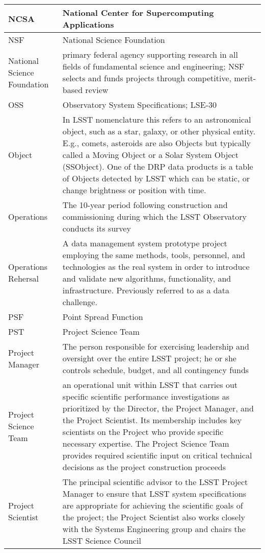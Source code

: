 \begin{longtable}{|l|p{}|}
NCSA & National \gls{Center} for Supercomputing Applications \\\hline
NSF & \gls{National Science Foundation} \\\hline
National Science Foundation & primary federal agency supporting research in all fields of fundamental science and engineering; \gls{NSF} selects and funds projects through competitive, merit-based review \\\hline
OSS & Observatory System Specifications; LSE-30 \\\hline
Object & In \gls{LSST} nomenclature this refers to an \gls{astronomical object}, such as a star, galaxy, or other physical entity. E.g., comets, asteroids are also Objects but typically called a Moving Object or a \gls{Solar System Object} (SSObject). One of the \gls{DRP} data products is a table of Objects detected by \gls{LSST} which can be static, or change brightness or position with time. \\\hline
Operations & The 10-year period following construction and commissioning during which the \gls{LSST} Observatory conducts its survey \\\hline
Operations Rehersal & A data management system prototype project employing the same methods, tools, personnel, and technologies as the real system in order to introduce and validate new algorithms, functionality, and infrastructure. Previously referred to as a data challenge. \\\hline
PSF & Point Spread Function \\\hline
PST & \gls{Project Science Team} \\\hline
Project Manager & The person responsible for exercising leadership and oversight over the entire \gls{LSST} project; he or she controls schedule, budget, and all contingency funds \\\hline
Project Science Team & an operational unit within \gls{LSST} that carries out specific scientific performance investigations as prioritized by the \gls{Director}, the \gls{Project Manager}, and the \gls{Project Scientist}. Its membership includes key scientists on the Project who provide specific necessary expertise. The \gls{Project Science Team} provides required scientific input on critical technical decisions as the project construction proceeds \\\hline
Project Scientist & The principal scientific advisor to the \gls{LSST} \gls{Project Manager} to ensure that \gls{LSST} system specifications are appropriate for achieving the scientific goals of the project; the \gls{Project Scientist} also works closely with the \gls{Systems Engineering} group and chairs the \gls{LSST} Science Council \\\hline

\end{longtable}
